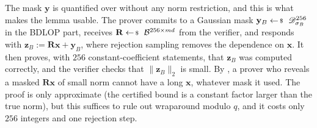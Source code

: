 \documentclass[../../book.tex]{subfiles}
\begin{document}
The mask $\mathbf{y}$ is quantified over without any norm restriction, and this is what makes the lemma usable.
The prover commits to a Gaussian mask $\mathbf{y}_B \leftarrowS \dgaussian_{\sigma_B}^{256}$ in the BDLOP part, receives $\mathbf{R} \leftarrowS \mathcal{B}^{256 \times md}$ from the verifier, and responds with $\mathbf{z}_B := \mathbf{R}\mathbf{x} + \mathbf{y}_B$, where rejection sampling removes the dependence on $\mathbf{x}$.
It then proves, with $256$ constant-coefficient statements, that $\mathbf{z}_B$ was computed correctly, and the verifier checks that $\|\mathbf{z}_B\|_2$ is small.
By , a prover who reveals a masked $\mathbf{R}\mathbf{x}$ of small norm cannot have a long $\mathbf{x}$, whatever mask it used.
The proof is only approximate (the certified bound is a constant factor larger than the true norm), but this suffices to rule out wraparound modulo $q$, and it costs only $256$ integers and one rejection step.
\end{document}
